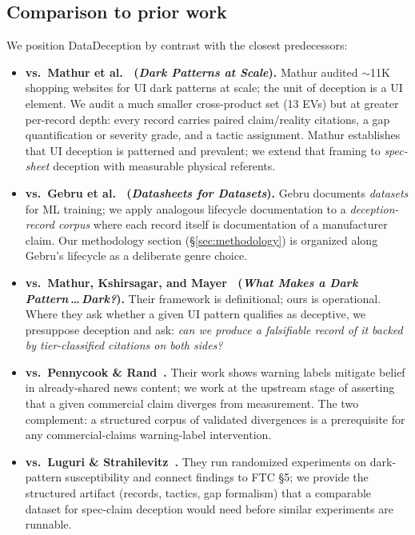 \documentclass{article}
\begin{document}
\subsection{Comparison to prior work}\label{sec:rw_comparison}

We position DataDeception by contrast with the closest predecessors:

\begin{itemize}
  \item \textbf{vs.\ Mathur et al.~\cite{mathur_darkpatterns_2019} (\emph{Dark Patterns at Scale}).} Mathur audited $\sim$11K shopping websites for UI dark patterns at scale; the unit of deception is a UI element. We audit a much smaller cross-product set (13 EVs) but at greater per-record depth: every record carries paired claim/reality citations, a gap quantification or severity grade, and a tactic assignment. Mathur establishes that UI deception is patterned and prevalent; we extend that framing to \emph{spec-sheet} deception with measurable physical referents.
  \item \textbf{vs.\ Gebru et al.~\cite{gebru_datasheets_2021} (\emph{Datasheets for Datasets}).} Gebru documents \emph{datasets} for ML training; we apply analogous lifecycle documentation to a \emph{deception-record corpus} where each record itself is documentation of a manufacturer claim. Our methodology section (\S\ref{sec:methodology}) is organized along Gebru's lifecycle as a deliberate genre choice.
  \item \textbf{vs.\ Mathur, Kshirsagar, and Mayer~\cite{mathur_darkdark_2021} (\emph{What Makes a Dark Pattern\,\ldots\,Dark?}).} Their framework is definitional; ours is operational. Where they ask whether a given UI pattern qualifies as deceptive, we presuppose deception and ask: \emph{can we produce a falsifiable record of it backed by tier-classified citations on both sides?}
  \item \textbf{vs.\ Pennycook \& Rand~\cite{nhb_warning_labels_2024}.} Their work shows warning labels mitigate belief in already-shared news content; we work at the upstream stage of asserting that a given commercial claim diverges from measurement. The two complement: a structured corpus of validated divergences is a prerequisite for any commercial-claims warning-label intervention.
  \item \textbf{vs.\ Luguri \& Strahilevitz~\cite{luguri_darkpatterns_2021}.} They run randomized experiments on dark-pattern susceptibility and connect findings to FTC \S 5; we provide the structured artifact (records, tactics, gap formalism) that a comparable dataset for spec-claim deception would need before similar experiments are runnable.
\end{itemize}
\end{document}
